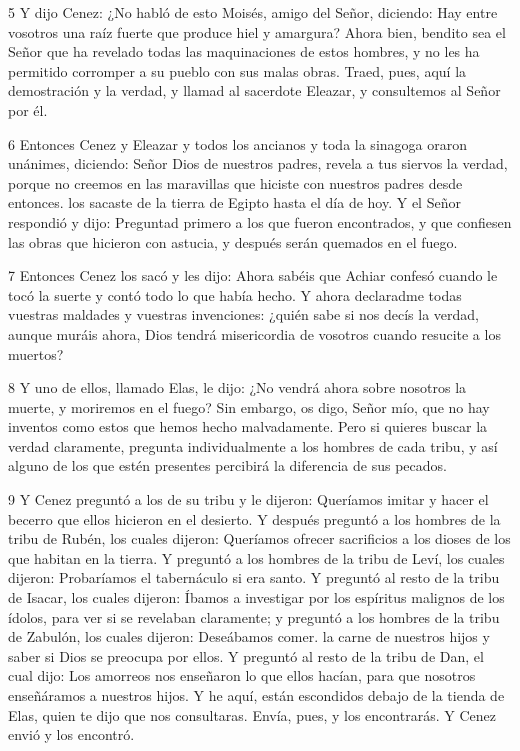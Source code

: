 \par 5 Y dijo Cenez: ¿No habló de esto Moisés, amigo del Señor, diciendo: Hay entre vosotros una raíz fuerte que produce hiel y amargura? Ahora bien, bendito sea el Señor que ha revelado todas las maquinaciones de estos hombres, y no les ha permitido corromper a su pueblo con sus malas obras. Traed, pues, aquí la demostración y la verdad, y llamad al sacerdote Eleazar, y consultemos al Señor por él.

\par 6 Entonces Cenez y Eleazar y todos los ancianos y toda la sinagoga oraron unánimes, diciendo: Señor Dios de nuestros padres, revela a tus siervos la verdad, porque no creemos en las maravillas que hiciste con nuestros padres desde entonces. los sacaste de la tierra de Egipto hasta el día de hoy. Y el Señor respondió y dijo: Preguntad primero a los que fueron encontrados, y que confiesen las obras que hicieron con astucia, y después serán quemados en el fuego.

\par 7 Entonces Cenez los sacó y les dijo: Ahora sabéis que Achiar confesó cuando le tocó la suerte y contó todo lo que había hecho. Y ahora declaradme todas vuestras maldades y vuestras invenciones: ¿quién sabe si nos decís la verdad, aunque muráis ahora, Dios tendrá misericordia de vosotros cuando resucite a los muertos?

\par 8 Y uno de ellos, llamado Elas, le dijo: ¿No vendrá ahora sobre nosotros la muerte, y moriremos en el fuego? Sin embargo, os digo, Señor mío, que no hay inventos como estos que hemos hecho malvadamente. Pero si quieres buscar la verdad claramente, pregunta individualmente a los hombres de cada tribu, y así alguno de los que estén presentes percibirá la diferencia de sus pecados.

\par 9 Y Cenez preguntó a los de su tribu y le dijeron: Queríamos imitar y hacer el becerro que ellos hicieron en el desierto. Y después preguntó a los hombres de la tribu de Rubén, los cuales dijeron: Queríamos ofrecer sacrificios a los dioses de los que habitan en la tierra. Y preguntó a los hombres de la tribu de Leví, los cuales dijeron: Probaríamos el tabernáculo si era santo. Y preguntó al resto de la tribu de Isacar, los cuales dijeron: Íbamos a investigar por los espíritus malignos de los ídolos, para ver si se revelaban claramente; y preguntó a los hombres de la tribu de Zabulón, los cuales dijeron: Deseábamos comer. la carne de nuestros hijos y saber si Dios se preocupa por ellos. Y preguntó al resto de la tribu de Dan, el cual dijo: Los amorreos nos enseñaron lo que ellos hacían, para que nosotros enseñáramos a nuestros hijos. Y he aquí, están escondidos debajo de la tienda de Elas, quien te dijo que nos consultaras. Envía, pues, y los encontrarás. Y Cenez envió y los encontró.

